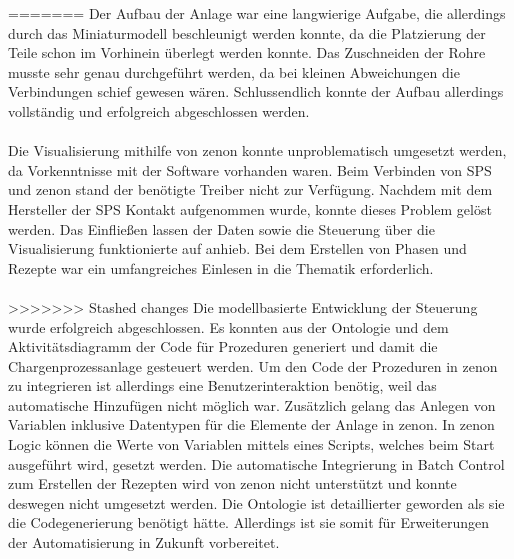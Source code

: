 =======
Der Aufbau der Anlage war eine langwierige Aufgabe, die allerdings durch das Miniaturmodell beschleunigt werden konnte, da die Platzierung der Teile schon im Vorhinein überlegt werden konnte. Das Zuschneiden der Rohre musste sehr genau durchgeführt werden, da bei kleinen Abweichungen die Verbindungen schief gewesen wären. Schlussendlich konnte der Aufbau allerdings vollständig und erfolgreich abgeschlossen werden. \\\\
Die Visualisierung mithilfe von zenon konnte unproblematisch umgesetzt werden, da Vorkenntnisse mit der Software vorhanden waren. Beim Verbinden von SPS und zenon stand der benötigte Treiber nicht zur Verfügung. Nachdem mit dem Hersteller der SPS Kontakt aufgenommen wurde, konnte dieses Problem gelöst werden. Das Einfließen lassen der Daten sowie die Steuerung über die Visualisierung funktionierte auf anhieb. Bei dem Erstellen von Phasen und Rezepte war ein umfangreiches Einlesen in die Thematik erforderlich.\\\\
>>>>>>> Stashed changes
Die modellbasierte Entwicklung der Steuerung wurde erfolgreich abgeschlossen. Es konnten aus der Ontologie und dem Aktivitätsdiagramm der Code für Prozeduren generiert und damit die Chargenprozessanlage gesteuert werden. Um den Code der Prozeduren in zenon zu integrieren ist allerdings eine Benutzerinteraktion benötig, weil das automatische Hinzufügen nicht möglich war. Zusätzlich gelang das Anlegen von Variablen inklusive Datentypen für die Elemente der Anlage in zenon. In zenon Logic können die Werte von Variablen mittels eines Scripts, welches beim Start ausgeführt wird, gesetzt werden. 
Die automatische Integrierung in Batch Control zum Erstellen der Rezepten wird von zenon nicht unterstützt und konnte deswegen nicht umgesetzt werden. 
Die Ontologie ist detaillierter geworden als sie die Codegenerierung benötigt hätte. Allerdings ist sie somit für Erweiterungen der Automatisierung in Zukunft vorbereitet. 


















